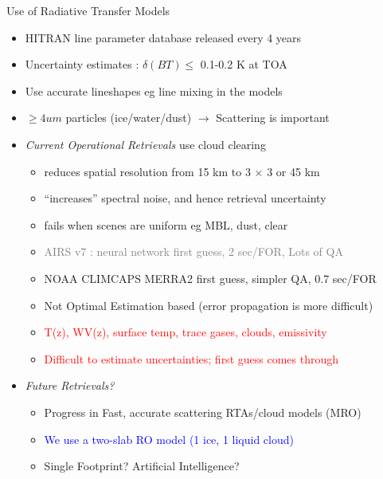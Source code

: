 \documentclass[10pt,t]{beamer}
\begin{document}
\begin{frame}{Use of Radiative Transfer Models}
\vspace{-0.1in}

\begin{itemize}
  \item HITRAN line parameter database released every 4 years
  \item Uncertainty estimates : $\delta(BT) \le$ 0.1-0.2 K at TOA  
  \item Use accurate lineshapes eg line mixing in the models
  \item $\ge 4 um$ particles (ice/water/dust) $\rightarrow$ Scattering is important
  \item \emph{Current Operational Retrievals} use cloud clearing
    \begin{itemize}
    \item reduces spatial resolution from 15 km to 3 $\times$ 3 or 45 km
    \item ``increases'' spectral noise, and hence retrieval uncertainty
    \item fails when scenes are uniform eg MBL, dust, clear
    \item \textcolor{gray}{AIRS v7 : neural network first guess, 2 sec/FOR, Lots of QA}
    \item NOAA CLIMCAPS MERRA2 first guess, simpler QA, 0.7 sec/FOR
    \item Not Optimal Estimation based (error propagation is more difficult)
    \item \textcolor{red}{T(z), WV(z), surface temp, trace gases, clouds, emissivity}
    \item \textcolor{red}{Difficult to estimate uncertainties; first guess comes through}
  \end{itemize}
  \item \emph{Future Retrievals?}
    \begin{itemize}
    \item Progress in Fast, accurate scattering RTAs/cloud models (MRO) 
    \item \textcolor{blue}{We use a two-slab RO model (1 ice, 1 liquid cloud)}
    \item Single Footprint? Artificial Intelligence?
  \end{itemize}
\end{itemize}
\end{frame}
\end{document}
